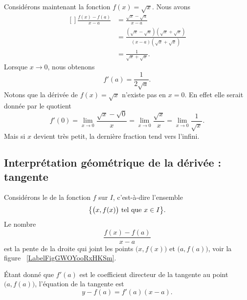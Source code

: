 Considérons maintenant la fonction $f(x)=\sqrt{x}$. Nous avons
\begin{equation}
	\begin{aligned}[]
		\frac{ f(x)-f(a) }{ x-a }&=\frac{ \sqrt{x}-\sqrt{a} }{ x-a }\\
		&=\frac{ (\sqrt{x}-\sqrt{a})(\sqrt{x}+\sqrt{x}) }{ (x-a)(\sqrt{x}+\sqrt{x}) }\\
		&=\frac{1}{ \sqrt{x}+\sqrt{x} }.
	\end{aligned}
\end{equation}
Lorsque $x\to 0$, nous obtenons
\begin{equation}
	f'(a)=\frac{1}{ 2\sqrt{a} }.
\end{equation}
Notons que la dérivée de $f(x)=\sqrt{x}$ n'existe pas en $x=0$. En effet elle serait donnée par le quotient
\begin{equation}
	f'(0)=\lim_{x\to 0} \frac{ \sqrt{x}-\sqrt{0} }{ x }=\lim_{x\to 0} \frac{ \sqrt{x} }{ x }=\lim_{x\to 0} \frac{1}{ \sqrt{x} }.
\end{equation}
Mais si $x$ devient très petit, la dernière fraction tend vers l'infini.

\subsection[Interprétation géométrique : tangente]{Interprétation géométrique de la dérivée : tangente}

Considérons le  de la fonction $f$ sur $I$, c'est-à-dire l'ensemble
\begin{equation}
	\big\{ \big( x,f(x) \big)\text{ tel que } x\in I \big\}.
\end{equation}
Le nombre
\begin{equation}
	\frac{ f(x)-f(a) }{ x-a }
\end{equation}
est la pente de la droite qui joint les points $\big( x,f(x) \big)$ et $\big( a,f(a) \big)$, voir la figure ~\ref{LabelFigGWOYooRxHKSm}. %
\newcommand{\CaptionFigGWOYooRxHKSm}{Le coefficient directeur de la corde entre $a$ et $x$.}


Étant donné que $f'(a)$ est le coefficient directeur de la tangente au point $\big( a,f(a) \big)$, l'équation de la tangente est
\begin{equation}		\label{EqTgfaen}
	y-f(a)=f'(a)(x-a).
\end{equation}

